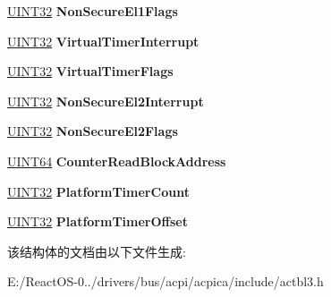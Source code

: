 \begin{DoxyCompactItemize}
\hyperlink{_processor_bind_8h_ae1e6edbbc26d6fbc71a90190d0266018}{U\+I\+N\+T32} {\bfseries Non\+Secure\+El1\+Flags}
\item 
\mbox{\label{structacpi__table__gtdt_a0a2c5ab904867d025166dd0b7c9c1d09}} 
\hyperlink{_processor_bind_8h_ae1e6edbbc26d6fbc71a90190d0266018}{U\+I\+N\+T32} {\bfseries Virtual\+Timer\+Interrupt}
\item 
\mbox{\label{structacpi__table__gtdt_abe2205382c4150e24c8c94ec820fe946}} 
\hyperlink{_processor_bind_8h_ae1e6edbbc26d6fbc71a90190d0266018}{U\+I\+N\+T32} {\bfseries Virtual\+Timer\+Flags}
\item 
\mbox{\label{structacpi__table__gtdt_a52bb5e5602ecb359f6f194ba792f85e8}} 
\hyperlink{_processor_bind_8h_ae1e6edbbc26d6fbc71a90190d0266018}{U\+I\+N\+T32} {\bfseries Non\+Secure\+El2\+Interrupt}
\item 
\mbox{\label{structacpi__table__gtdt_a7132cf1a20ca5c4a86c5c63411d8b761}} 
\hyperlink{_processor_bind_8h_ae1e6edbbc26d6fbc71a90190d0266018}{U\+I\+N\+T32} {\bfseries Non\+Secure\+El2\+Flags}
\item 
\mbox{\label{structacpi__table__gtdt_afc81f47105b49170fcc9a2d0f96271b2}} 
\hyperlink{_processor_bind_8h_a57be03562867144161c1bfee95ca8f7c}{U\+I\+N\+T64} {\bfseries Counter\+Read\+Block\+Address}
\item 
\mbox{\label{structacpi__table__gtdt_ae6c8841a32d8ee966b4cec2d5d86d809}} 
\hyperlink{_processor_bind_8h_ae1e6edbbc26d6fbc71a90190d0266018}{U\+I\+N\+T32} {\bfseries Platform\+Timer\+Count}
\item 
\mbox{\label{structacpi__table__gtdt_ab49c300025d9b658769e9e756a44312d}} 
\hyperlink{_processor_bind_8h_ae1e6edbbc26d6fbc71a90190d0266018}{U\+I\+N\+T32} {\bfseries Platform\+Timer\+Offset}
\end{DoxyCompactItemize}


该结构体的文档由以下文件生成\+:\begin{DoxyCompactItemize}
\item 
E\+:/\+React\+O\+S-\/0../drivers/bus/acpi/acpica/include/actbl3.\+h\end{DoxyCompactItemize}
